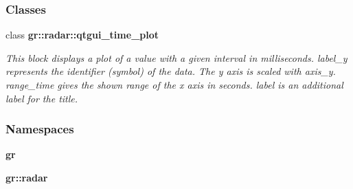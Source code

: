 \subsubsection*{Classes}
\begin{DoxyCompactItemize}
\item 
class {\bf gr\+::radar\+::qtgui\+\_\+time\+\_\+plot}
\begin{DoxyCompactList}\small\item\em This block displays a plot of a value with a given interval in milliseconds. label\+\_\+y represents the identifier (symbol) of the data. The y axis is scaled with axis\+\_\+y. range\+\_\+time gives the shown range of the x axis in seconds. label is an additional label for the title. \end{DoxyCompactList}\end{DoxyCompactItemize}
\subsubsection*{Namespaces}
\begin{DoxyCompactItemize}
\item 
 {\bf gr}
\item 
 {\bf gr\+::radar}
\end{DoxyCompactItemize}
